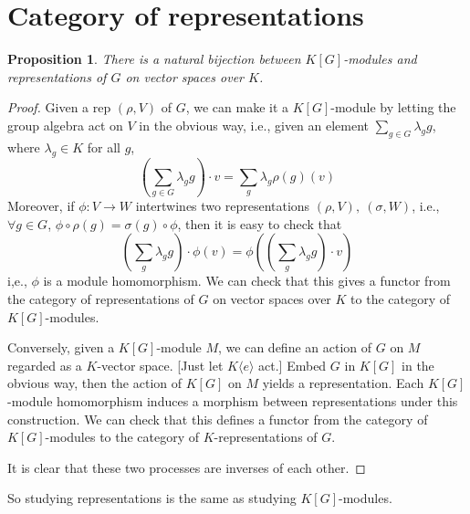 \documentclass{article}
\theoremstyle{definition}
\theoremstyle{remark}
\theoremstyle{plain}
\newtheorem{prop}[defn]{Proposition}
\begin{document}
\section{Category of representations}
\begin{prop}
    There is a natural bijection between $K[G]$-modules and representations of $G$ on vector spaces over $K$.
\end{prop}
\begin{proof}
    Given a rep $(\rho,V)$ of $G$, we can make it a $K[G]$-module by letting the group algebra act on $V$ in the obvious way, i.e., given an element $\sum_{g\in G}\lambda_gg$, where $\lambda_g\in K$ for all $g$,
    \[\left(\sum_{g\in G}\lambda_gg\right)\cdot v=\sum_g\lambda_g\rho(g)(v)\]
    Moreover, if $\phi:V\to W$ intertwines two representations $(\rho, V),\ (\sigma,W)$, i.e., $\forall g\in G$, $\phi\circ\rho(g)=\sigma(g)\circ\phi$, then it is easy to check that
    \[\left(\sum_g\lambda_gg\right)\cdot \phi(v)=\phi\left(\left(\sum_g\lambda_gg\right)\cdot v\right)\]
    i,e., $\phi$ is a module homomorphism. We can check that this gives a functor from the category of representations of $G$ on vector spaces over $K$ to the category of $K[G]$-modules.
    
    Conversely, given a $K[G]$-module $M$, we can define an action of $G$ on $M$ regarded as a $K$-vector space. [Just let $K\langle e\rangle$ act.] Embed $G$ in $K[G]$ in the obvious way, then the action of $K[G]$ on $M$ yields a representation. Each $K[G]$-module homomorphism induces a morphism between representations under this construction. We can check that this defines a functor from the category of $K[G]$-modules to the category of $K$-representations of $G$.

    It is clear that these two processes are inverses of each other.
\end{proof}
So studying representations is the same as studying $K[G]$-modules.
\end{document}
